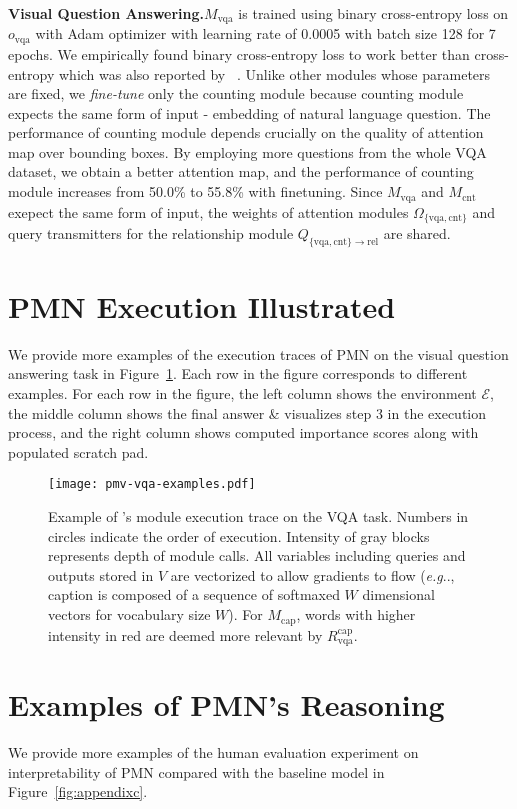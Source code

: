 \documentclass{article}
\makeatletter
\def\E{\mathcal{E}}
\def\Mcnt{M_\mathrm{cnt}}
\def\Mcap{M_\mathrm{cap}}
\def\Mvqa{M_\mathrm{vqa}}
\DeclareRobustCommand\onedot{\futurelet\@let@token\@onedot}
\def\@onedot{\ifx\@let@token.\else.\null\fi\xspace}
\def\eg{\emph{e.g}\onedot} \def\Eg{\emph{E.g}\onedot}
\makeatother
\begin{document}
\textbf{Visual Question Answering.}$\Mvqa$ is trained using binary cross-entropy loss on $o_\mathrm{vqa}$ with Adam optimizer with learning rate of 0.0005 with batch size 128 for 7 epochs. We empirically found binary cross-entropy loss to work better than cross-entropy which was also reported by ~\cite{anderson17}.
Unlike other modules whose parameters are fixed, we \emph{fine-tune} only the counting module because counting module expects the same form of input - embedding of natural language question.
The performance of counting module depends crucially on the quality of attention map over bounding boxes.
By employing more questions from the whole VQA dataset, we obtain a better attention map, and the performance of counting module increases from 50.0\% to 55.8\% with finetuning.
Since $\Mvqa$ and $\Mcnt$ exepect the same form of input, the weights of attention modules $\Omega_\mathrm{\{vqa,cnt\}}$ and query transmitters for the relationship module $Q_\mathrm{\{vqa,cnt\} \rightarrow rel}$ are shared.

\newpage\section{PMN Execution Illustrated}\label{sec:appendix_pmn_exec}
We provide more examples of the execution traces of PMN on the visual question answering task in Figure~\ref{fig:appendixb2}.
Each row in the figure corresponds to different examples. For each row in the figure, the left column shows the environment $\E$, the middle column shows the final answer \& visualizes step 3 in the execution process, and
the right column shows computed importance scores along with populated scratch pad.
\begin{figure}[!htb]
\texttt{[image: pmv-vqa-examples.pdf]}
\vspace{-15mm}
\caption{
\small Example of \PMN's module execution trace on the VQA task.
Numbers in circles indicate the order of execution.
Intensity of gray blocks represents depth of module calls.
All variables including queries and outputs stored in $V$ are vectorized to allow gradients to flow
(\eg, caption is composed of a sequence of softmaxed $W$ dimensional vectors for vocabulary size $W$).
For $\Mcap$, words with higher intensity in red are deemed more relevant by $R_\mathrm{vqa}^\mathrm{cap}$.
}
\label{fig:appendixb2}
\vspace{-2mm}
\end{figure}\newpage\section{Examples of PMN's Reasoning}\label{sec:appendix_pmn_reasoning}
We provide more examples of the human evaluation experiment on interpretability of PMN compared with the baseline model in Figure~\ref{fig:appendixc}.
\end{document}
